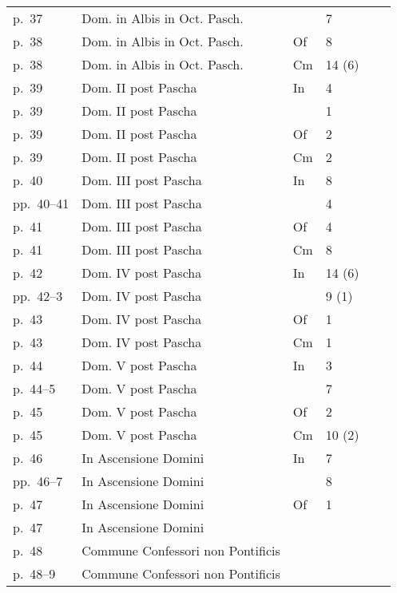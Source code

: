 \begin{longtable}[c]{@{}llllll@{}}
  p.\ 37 & Dom. in Albis in Oct. Pasch. &  & 7 & \flat{} &  \\
  p.\ 38 & Dom. in Albis in Oct. Pasch. & Of & 8 & \sharp{} &  \\
  p.\ 38 & Dom. in Albis in Oct. Pasch. & Cm & 14 (6) & \flat{}\flat{}\flat{} &  \\
  p.\ 39 & Dom. II post Pascha & In & 4 & \flat{}\flat{} &  \\
  p.\ 39 & Dom. II post Pascha &  & 1 & \flat{}\flat{} &  \\
  p.\ 39 & Dom. II post Pascha & Of & 2 & \sharp{}\sharp{} &  \\
  p.\ 39 & Dom. II post Pascha & Cm & 2 & \sharp{}\sharp{} &  \\
  p.\ 40 & Dom. III post Pascha & In & 8 & \sharp{} &  \\
  pp.\ 40--41 & Dom. III post Pascha &  & 4 & \flat{}\flat{} &  \\
  p.\ 41 & Dom. III post Pascha & Of & 4 & \flat{}\flat{} &  \\
  p.\ 41 & Dom. III post Pascha & Cm & 8 & \sharp{} &  \\
  p.\ 42 & Dom. IV post Pascha & In & 14 (6) & \flat{}\flat{}\flat{} &  \\
  pp.\ 42--3 & Dom. IV post Pascha &  & 9 (1) & \flat{}\flat{}\flat{} &  \\
  p.\ 43 & Dom. IV post Pascha & Of & 1 & \flat{}\flat{} &  \\
  p.\ 43 & Dom. IV post Pascha & Cm & 1 & \sharp{} &  \\
  p.\ 44 & Dom. V post Pascha & In & 3 & \sharp{} & \bullet{} \\
  p.\ 44--5 & Dom. V post Pascha &  & 7 & \flat{} & \bullet{} \\
  p.\ 45 & Dom. V post Pascha & Of & 2 & \sharp{}\sharp{} & \bullet{} \\
  p.\ 45 & Dom. V post Pascha & Cm & 10 (2) & \sharp{} & \bullet{} \\
  p.\ 46 & In Ascensione Domini & In & 7 & \flat{} & \bullet{} \\
  pp.\ 46--7 & In Ascensione Domini &  & 8 & \sharp{} & \bullet{} \\
  p.\ 47 & In Ascensione Domini & Of & 1 & \flat{}\flat{} & \bullet{} \\
  p.\ 47 & In Ascensione Domini &  &  & \flat{}\flat{} & \bullet{} \\
  p.\ 48 & Commune Confessori non Pontificis &  &  & \flat{}\flat{}\flat{} & \bullet{} \\
  p.\ 48--9 & Commune Confessori non Pontificis &  &  & \flat{}\flat{} & \bullet{} \\

\end{longtable}
